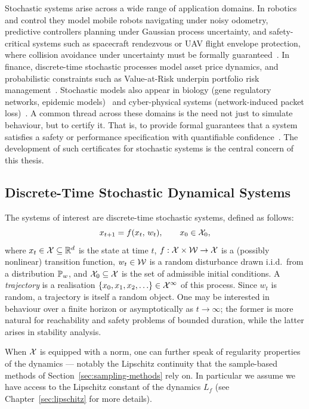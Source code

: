 Stochastic systems arise across a wide range of application domains. In robotics and
control they model mobile robots navigating under noisy odometry, predictive controllers planning
under Gaussian process uncertainty, and safety-critical systems such as spacecraft rendezvous or
UAV flight envelope protection, where collision avoidance under uncertainty must be formally
guaranteed~\cite{mesbah2016stochastic}. In finance, discrete-time stochastic processes model asset price dynamics, and
probabilistic constraints such as Value-at-Risk underpin portfolio risk management~\cite{jorion2007value}. Stochastic
models also appear in biology (gene regulatory networks, epidemic models)~\cite{allen2008introduction} and cyber-physical
systems (network-induced packet loss)~\cite{schenato2007foundations}. A common thread across these domains is the need not just
to simulate behaviour, but to certify it. That is, to provide formal guarantees that a system
satisfies a safety or performance specification with quantifiable confidence~\cite{lechner2022stability, badings2025logRASM}. The development of
such certificates for stochastic systems is the central concern of this thesis.


\subsection{Discrete-Time Stochastic Dynamical Systems}

The systems of interest are discrete-time stochastic systems, defined as follows:
%
\begin{equation}
    x_{t+1} = f(x_t,\, w_t), \qquad x_0 \in \mathcal{X}_0,
    \label{eq:stochastic-system}
\end{equation}
%
where $x_t \in \mathcal{X} \subseteq \mathbb{R}^d$ is the state at time $t$,
$f : \mathcal{X} \times \mathcal{W} \to \mathcal{X}$ is a (possibly nonlinear) transition function,
$w_t \in \mathcal{W}$ is a random disturbance drawn i.i.d.\ from a distribution $\mathbb{P}_w$,
and $\mathcal{X}_0 \subseteq \mathcal{X}$ is the set of admissible initial conditions.
A \textit{trajectory} is a realisation $\{x_0, x_1, x_2, \ldots\} \in \mathcal{X}^\infty$ of this
process. Since $w_t$ is random, a trajectory is itself a random object. One may be interested in behaviour over a finite horizon or asymptotically as $t \to \infty$; the former is more natural for reachability and safety problems
of bounded duration, while the latter arises in stability analysis.

When $\mathcal{X}$ is equipped with a norm, one can further speak of regularity
properties of the dynamics --- notably the Lipschitz continuity that the
sample-based methods of Section~\ref{sec:sampling-methods} rely on. In particular we assume we have access to the Lipschitz constant of the dynamics $L_f$ (see Chapter~\ref{sec:lipschitz} for more details).

